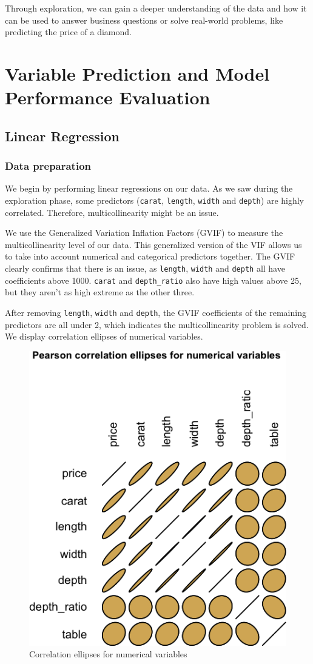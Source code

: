 \documentclass[
  paper=a4,
  ,captions=tableheading
]{scrartcl}
\begin{document}
Through exploration, we can gain a deeper understanding of the data and
how it can be used to answer business questions or solve real-world
problems, like predicting the price of a diamond.

\hypertarget{variable-prediction-and-model-performance-evaluation}{%
\section{Variable Prediction and Model Performance
Evaluation}\label{variable-prediction-and-model-performance-evaluation}}

\hypertarget{linear-regression}{%
\subsection{Linear Regression}\label{linear-regression}}

\hypertarget{data-preparation}{%
\subsubsection{Data preparation}\label{data-preparation}}

We begin by performing linear regressions on our data. As we saw during
the exploration phase, some predictors (\texttt{carat}, \texttt{length},
\texttt{width} and \texttt{depth}) are highly correlated. Therefore,
multicollinearity might be an issue.

We use the Generalized Variation Inflation Factors (GVIF) to measure the
multicollinearity level of our data. This generalized version of the VIF
allows us to take into account numerical and categorical predictors
together. The GVIF clearly confirms that there is an issue, as
\texttt{length}, \texttt{width} and \texttt{depth} all have coefficients
above 1000. \texttt{carat} and \texttt{depth\_ratio} also have high
values above 25, but they aren't as high extreme as the other three.

After removing \texttt{length}, \texttt{width} and \texttt{depth}, the
GVIF coefficients of the remaining predictors are all under 2, which
indicates the multicollinearity problem is solved. We display
correlation ellipses of numerical variables.

\begin{figure}[H]

{\centering \includegraphics[width=0.4\linewidth,]{Diamonds_PDF_files/figure-latex/uncorrelated-ellipses-1} 

}

\caption{Correlation ellipses for numerical variables}\label{fig:uncorrelated-ellipses}
\end{figure}
\end{document}
